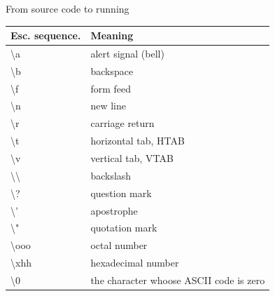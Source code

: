 \documentclass[usenames,dvipsnames,aspectratio=169]{beamer}
\begin{document}
\begin{frame}{From source code to running}
\begin{center}
\begin{tabular}{ll}
Esc. sequence. & Meaning\\ \hline
\textbackslash{a} & alert signal (bell)\\
\textbackslash{b} & backspace\\
\textbackslash{f} & form feed\\
\textbackslash{n} & new line\\
\textbackslash{r} & carriage return\\
\textbackslash{t} & horizontal tab, HTAB\\
\textbackslash{v} & vertical tab, VTAB\\
\textbackslash{\textbackslash} & backslash\\
\textbackslash{?} & question mark\\
\textbackslash{'} & apostrophe\\
\textbackslash{"} & quotation mark\\
\textbackslash{ooo} & octal number\\
\textbackslash{xhh} & hexadecimal number\\
\textbackslash{0} & the character whoose ASCII code is zero
\end{tabular}
\end{center}
\end{frame}
\end{document}
